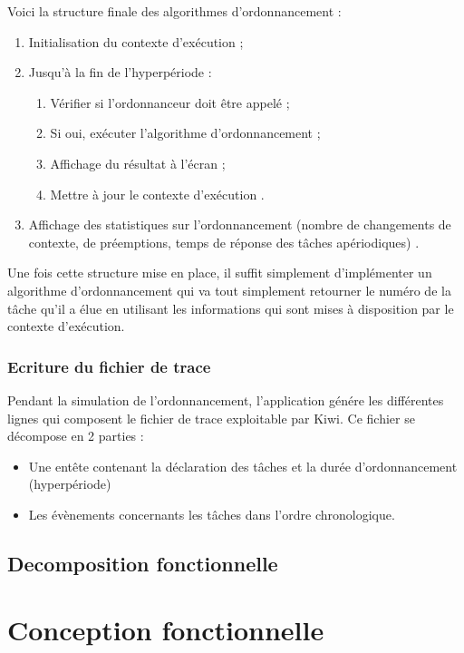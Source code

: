 				Voici la structure finale des algorithmes d'ordonnancement :
				\begin{enumerate}
					\item Initialisation du contexte d'exécution ;
					\item Jusqu'à la fin de l'hyperpériode :
					\begin{enumerate}
						\item Vérifier si l'ordonnanceur doit être appelé ;
						\item Si oui, exécuter l'algorithme d'ordonnancement ;
						\item Affichage du résultat à l'écran ;
						\item Mettre à jour le contexte d'exécution .
					\end{enumerate}
					\item Affichage des statistiques sur l'ordonnancement (nombre de changements de contexte, de préemptions, temps de réponse des tâches apériodiques) .
				\end{enumerate}
				
				Une fois cette structure mise en place, il suffit simplement d'implémenter un algorithme d'ordonnancement qui va tout simplement retourner le numéro de la tâche qu'il a élue en utilisant les informations qui sont mises à disposition par le contexte d'exécution.
			
			\subsubsection{Ecriture du fichier de trace}
				Pendant la simulation de l'ordonnancement, l'application génére les différentes lignes qui composent le fichier de trace exploitable par Kiwi. Ce fichier se décompose en 2 parties :
					\begin{itemize}
						\item Une entête contenant la déclaration des tâches et la durée d'ordonnancement (hyperpériode)
						\item Les évènements concernants les tâches dans l'ordre chronologique.
					\end{itemize}

		\subsection{Decomposition fonctionnelle}

	\section{Conception fonctionnelle}
		
